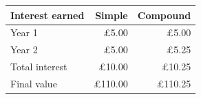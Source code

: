 \begin{tabular}{lrr}\toprule
Interest earned & Simple & Compound\\\midrule
Year 1 & £5.00 & £5.00\\
Year 2 & £5.00 & £5.25\\
Total interest & £10.00 & £10.25\\
Final value & £110.00 & £110.25\\
\bottomrule\end{tabular}
